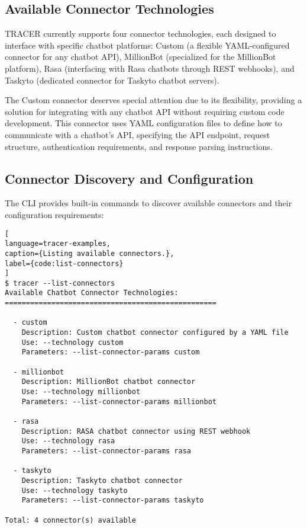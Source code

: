 \subsection{Available Connector Technologies}

\ac{TRACER} currently supports four connector technologies,
each designed to interface with specific chatbot platforms:
Custom (a flexible YAML-configured connector for any chatbot \ac{API}),
MillionBot (specialized for the MillionBot platform),
Rasa (interfacing with Rasa chatbots through \ac{REST} webhooks),
and Taskyto (dedicated connector for Taskyto chatbot servers).

The Custom connector deserves special attention due to its flexibility,
providing a solution for integrating with any chatbot \ac{API}
without requiring custom code development.
This connector uses YAML configuration files
to define how to communicate with a chatbot's \ac{API},
specifying the \ac{API} endpoint, request structure,
authentication requirements, and response parsing instructions.

\subsection{Connector Discovery and Configuration}

The \ac{CLI} provides built-in commands to discover available connectors
and their configuration requirements:

\begin{lstlisting}[
language=tracer-examples,
caption={Listing available connectors.},
label={code:list-connectors}
]
$ tracer --list-connectors
Available Chatbot Connector Technologies:
==================================================
  
  - custom
    Description: Custom chatbot connector configured by a YAML file
    Use: --technology custom
    Parameters: --list-connector-params custom

  - millionbot
    Description: MillionBot chatbot connector
    Use: --technology millionbot
    Parameters: --list-connector-params millionbot

  - rasa
    Description: RASA chatbot connector using REST webhook
    Use: --technology rasa
    Parameters: --list-connector-params rasa

  - taskyto
    Description: Taskyto chatbot connector
    Use: --technology taskyto
    Parameters: --list-connector-params taskyto

Total: 4 connector(s) available
\end{lstlisting}

